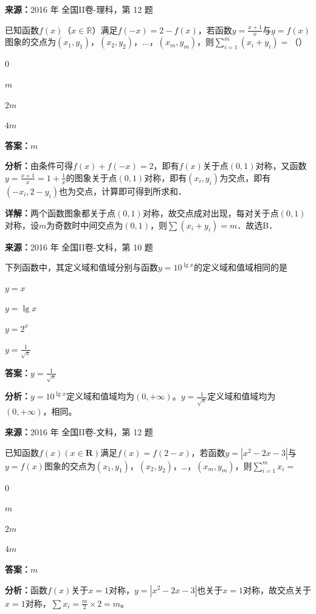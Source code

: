 \begin{question}[points=5]
\textbf{来源：}2016 年 全国II卷-理科，第 12 题\par
已知函数$f(x)$（$x\in\mathbb{R}$）满足$f(-x)=2-f(x)$，若函数$y=\frac{x+1}{x}$与$y=f(x)$图象的交点为$(x_1,y_1)$，$(x_2,y_2)$，$\ldots$，$(x_m,y_m)$，则$\sum_{i=1}^{m}(x_i+y_i)=$（\quad）
\begin{choices}
  \item $0$
  \item $m$
  \item $2m$
  \item $4m$
\end{choices}
\begin{solution}
\textbf{答案：}$m$

\textbf{分析：}由条件可得$f(x)+f(-x)=2$，即有$f(x)$关于点$(0,1)$对称，又函数$y=\frac{x+1}{x}=1+\frac{1}{x}$的图象关于点$(0,1)$对称，即有$(x_i,y_i)$为交点，即有$(-x_i,2-y_i)$也为交点，计算即可得到所求和．

\textbf{详解：}两个函数图象都关于点$(0,1)$对称，故交点成对出现，每对关于点$(0,1)$对称，设$m$为奇数时中间交点为$(0,1)$，则$\sum (x_i+y_i)=m$．故选B．
\end{solution}
\end{question}

\begin{question}[points=5]
\textbf{来源：}2016 年 全国II卷-文科，第 10 题\par
下列函数中，其定义域和值域分别与函数$y=10^{\lg x}$的定义域和值域相同的是
\begin{choices}
  \item $y=x$
  \item $y=\lg x$
  \item $y=2^x$
  \item $y=\frac{1}{\sqrt{x}}$
\end{choices}
\begin{solution}
\textbf{答案：}$y=\frac{1}{\sqrt{x}}$

\textbf{分析：}$y=10^{\lg x}$定义域和值域均为$(0,+\infty)$。$y=\frac{1}{\sqrt{x}}$定义域和值域均为$(0,+\infty)$，相同。
\end{solution}
\end{question}

\begin{question}[points=5]
\textbf{来源：}2016 年 全国II卷-文科，第 12 题\par
已知函数$f(x)(x\in\mathbf{R})$满足$f(x)=f(2-x)$，若函数$y=|x^2-2x-3|$与$y=f(x)$图象的交点为$(x_1,y_1)$，$(x_2,y_2)$，…，$(x_m,y_m)$，则$\sum_{i=1}^m x_i=$
\begin{choices}
  \item $0$
  \item $m$
  \item $2m$
  \item $4m$
\end{choices}
\begin{solution}
\textbf{答案：}$m$

\textbf{分析：}函数$f(x)$关于$x=1$对称，$y=|x^2-2x-3|$也关于$x=1$对称，故交点关于$x=1$对称，$\sum x_i = \frac{m}{2}\times2=m$。
\end{solution}
\end{question}

